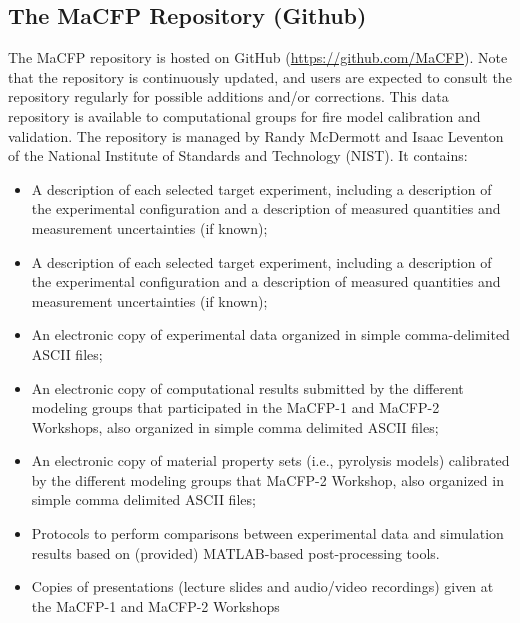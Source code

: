 \documentclass[12pt]{article}
\begin{document}
\subsection{The MaCFP Repository (Github)}
The MaCFP repository is hosted on GitHub (\url{https://github.com/MaCFP}). Note that the repository is continuously updated, and users are expected to consult the repository regularly for possible additions and/or corrections. This data repository is available to computational groups for fire model calibration and validation. The repository is managed by Randy McDermott and Isaac Leventon of the National Institute of Standards and Technology (NIST). It contains:
\begin{itemize}[noitemsep]
 \item A description of each selected target experiment, including a description of the experimental configuration and a description of measured quantities and measurement uncertainties (if known);
  \item A description of each selected target experiment, including a description of the experimental configuration and a description of measured quantities and measurement uncertainties (if known);
 \item An electronic copy of experimental data organized in simple comma-delimited ASCII files;
 \item An electronic copy of computational results submitted by the different modeling groups that participated in the MaCFP-1 and MaCFP-2 Workshops, also organized in simple comma delimited ASCII files;
  \item An electronic copy of material property sets (i.e., pyrolysis models) calibrated by the different modeling groups that MaCFP-2 Workshop, also organized in simple comma delimited ASCII files;
 \item Protocols to perform comparisons between experimental data and simulation results based on (provided) MATLAB-based post-processing tools.
 \item Copies of presentations (lecture slides and audio/video recordings) given at the MaCFP-1 and MaCFP-2 Workshops
\end{itemize}
\end{document}
